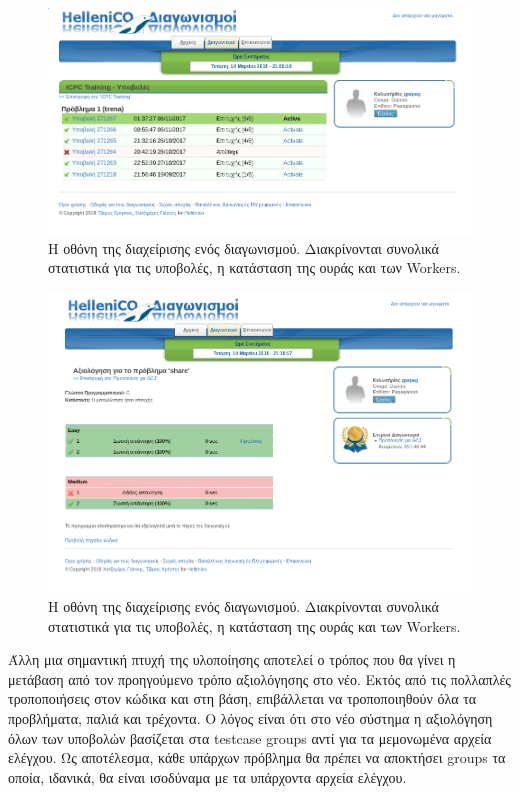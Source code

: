 \documentclass[diploma]{softlab-thesis}
\begin{document}
\begin{figure}
  \centering
  \includegraphics[scale=0.3]{Figures/allsubmissions.png}
  \caption[Οθόνη διαχείρισης προβλήματος]{Η οθόνη της διαχείρισης ενός διαγωνισμού.
  Διακρίνονται συνολικά στατιστικά για τις υποβολές, η κατάσταση της ουράς και των
  Workers.}
\end{figure}

\begin{figure}
  \centering
  \includegraphics[scale=0.3]{Figures/cursubmission.png}
  \caption[Οθόνη διαχείρισης προβλήματος]{Η οθόνη της διαχείρισης ενός διαγωνισμού.
  Διακρίνονται συνολικά στατιστικά για τις υποβολές, η κατάσταση της ουράς και των
  Workers.}
\end{figure}

\bigskip

Άλλη μια σημαντική πτυχή της υλοποίησης αποτελεί ο τρόπος που θα γίνει η
μετάβαση από τον προηγούμενο τρόπο αξιολόγησης στο νέο. Εκτός από τις πολλαπλές
τροποποιήσεις στον κώδικα και στη βάση, επιβάλλεται να τροποποιηθούν όλα τα
προβλήματα, παλιά και τρέχοντα. Ο λόγος είναι ότι στο νέο σύστημα η αξιολόγηση όλων
των υποβολών βασίζεται στα testcase groups αντί για τα μεμονωμένα αρχεία ελέγχου.
Ως αποτέλεσμα, κάθε υπάρχων πρόβλημα θα πρέπει να αποκτήσει groups τα οποία,
ιδανικά, θα είναι ισοδύναμα με τα υπάρχοντα αρχεία ελέγχου.
\end{document}
